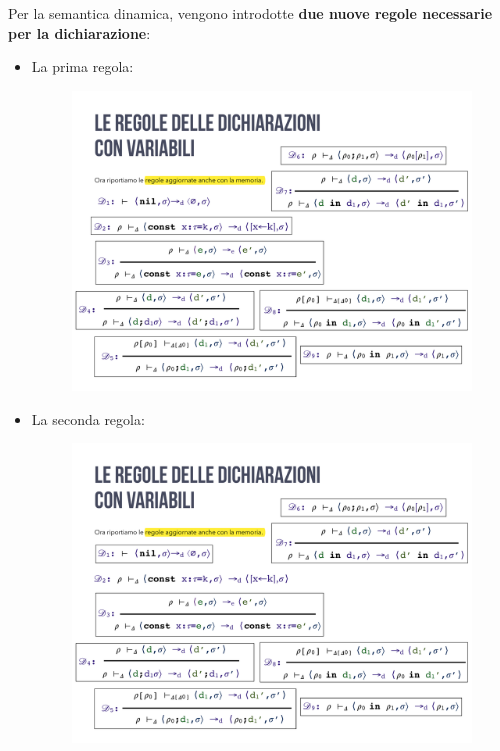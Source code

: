 \documentclass[a4paper]{article}
\begin{document}
 	Per la semantica dinamica, vengono introdotte \textbf{due nuove regole necessarie per la dichiarazione}:
 	\begin{itemize}
 		\item La prima regola:
 		\begin{figure}[!htp]
 			\centering
 			\includegraphics[width=.5\textwidth]{img/regola_dichiarazione-up-1.pdf}
 		\end{figure}
 	
 		\item La seconda regola:
 		\begin{figure}[!htp]
 			\centering
 			\includegraphics[width=.9\textwidth]{img/regola_dichiarazione-up-2.pdf}
 		\end{figure}
 	

\end{itemize}
\end{document}
